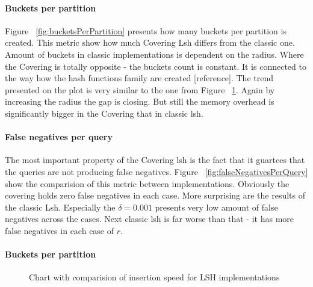 \paragraph{Buckets per partition}

Figure ~\ref{fig:bucketsPerPartition} presents how many buckets per partition is created. This metric show
how much Covering Lsh differs from the classic one. Amount of buckets in classic
implementations is dependent on the radius. Where the Covering is totally
opposite - the buckets count is constant. It is connected to the way how the
hash functions family are created [reference]. The trend presented on the plot
is very similar to the one from Figure ~\ref{fig:insertionsPerSecond}. Again by increasing the radius the
gap is closing. But still the memory overhead is significantly bigger in the
Covering that in classic lsh.

\paragraph{False negatives per query}

The most important property of the Covering lsh is the fact that it guartees
that the queries are not producing false negatives. Figure
~\ref{fig:falseNegativesPerQuery}
show the comparision of this metric between implementations. Obviously the
covering holds zero false negatives in each case. More surprising are the
results of the classic Lsh. Especially the $\delta = 0.001$ presents very low
amount of false negatives across the cases. Next classic lsh is far worse than that - it
has more false negatives in each case of $r$.

\paragraph{Buckets per partition}

\begin{figure}[ht]
\label{fig:insertionsPerSecond}
\caption{Chart with comparision of insertion speed for LSH implementations}
\end{figure}

